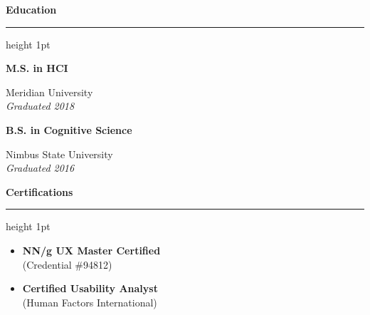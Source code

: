 \documentclass[10pt]{article}
\newcommand{\sidebarsubsection}[1]{%
  \vspace{4pt}%
  {\noindent\small\bfseries\color{primary} #1}%
  \vspace{1.5pt}%
}
\begin{document}
\begin{minipage}[t]{0.34\textwidth}
\begin{sidebarbox}
    \vspace{6pt}
    {\large\bfseries\color{primary} Education}
    \vspace{2pt}
    {\color{divider}\hrule height 1pt}
    \vspace{4pt}
    
    \sidebarsubsection{M.S. in HCI}
    Meridian University \\
    \textit{Graduated 2018}
    
    \sidebarsubsection{B.S. in Cognitive Science}
    Nimbus State University \\
    \textit{Graduated 2016}
    
    \vspace{6pt}
    {\large\bfseries\color{primary} Certifications}
    \vspace{2pt}
    {\color{divider}\hrule height 1pt}
    \vspace{4pt}
    
    \begin{itemize}[leftmargin=0pt, label={}]
      \item \textbf{NN/g UX Master Certified} \\ (Credential \#94812)
      \item \textbf{Certified Usability Analyst} \\ (Human Factors International)
    \end{itemize}
  \end{sidebarbox}
\end{minipage}
\end{document}
